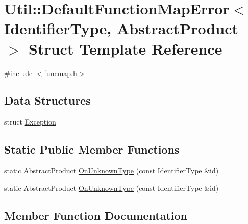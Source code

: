 \hypertarget{structUtil_1_1DefaultFunctionMapError}{}\section{Util\+:\+:Default\+Function\+Map\+Error$<$ Identifier\+Type, Abstract\+Product $>$ Struct Template Reference}
\label{structUtil_1_1DefaultFunctionMapError}


{\ttfamily \#include $<$funcmap.\+h$>$}

\subsection*{Data Structures}
\begin{DoxyCompactItemize}
\item 
struct \mbox{\hyperlink{structUtil_1_1DefaultFunctionMapError_1_1Exception}{Exception}}
\end{DoxyCompactItemize}
\subsection*{Static Public Member Functions}
\begin{DoxyCompactItemize}
\item 
static Abstract\+Product \mbox{\hyperlink{structUtil_1_1DefaultFunctionMapError_aebac7c15bf07b3c7b0c280eaea7b0eaa}{On\+Unknown\+Type}} (const Identifier\+Type \&id)
\item 
static Abstract\+Product \mbox{\hyperlink{structUtil_1_1DefaultFunctionMapError_aebac7c15bf07b3c7b0c280eaea7b0eaa}{On\+Unknown\+Type}} (const Identifier\+Type \&id)
\end{DoxyCompactItemize}


\subsection{Member Function Documentation}
\mbox{\label{structUtil_1_1DefaultFunctionMapError_aebac7c15bf07b3c7b0c280eaea7b0eaa}} 
